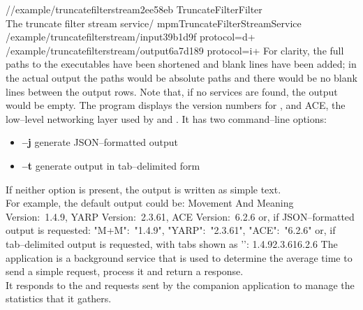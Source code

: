 /\serviceName/example/truncatefilterstream\textunderscore{}2ee58eb\pseudotab{}%
TruncateFilter\pseudotab{}Filter\pseudotab\\
The truncate filter stream service\pseudotwotabs\textellipsis/%
mpmTruncateFilterStreamService\pseudotab\\
/example/truncatefilterstream/input\textunderscore{}39b1d9f\textbraceleft{}%
protocol=d+\textbraceright\pseudotab\\
/example/truncatefilterstream/output\textunderscore{}6a7d189\textbraceleft{}%
protocol=i+\textbraceright
\outputEnd{}
For clarity, the full paths to the executables have been shortened and blank lines have
been added; in the actual output the paths would be absolute paths and there would be no
blank lines between the output rows.
Note that, if no services are found, the output would be empty.
The program  displays the version numbers for \mplusm{}, \yarp{}
and ACE, the low--level networking layer used by \mplusm{} and \yarp{}.
It has two command--line options:
\begin{itemize}
\item \textbf{--j} generate JSON--formatted output
\item \textbf{--t} generate output in tab--delimited form
\end{itemize}
If neither option is present, the output is written as simple text.\\

For example, the default output could be:
\outputBegin{}
Movement And Meaning Version:\ 1.4.9, YARP Version:\ 2.3.61, ACE Version:\ 6.2.6
\outputEnd{}
or, if JSON--formatted output is requested:
\outputBegin{}
\textbraceleft{} "M+M":\ "1.4.9", "YARP":\ "2.3.61", "ACE":\ "6.2.6" \textbraceright
\outputEnd{}
or, if tab--delimited output is requested, with tabs shown as
'\texttt{\boldmath{$\vdash$}}':
\outputBegin{}
1.4.9\pseudotab{}2.3.61\pseudotab{}6.2.6
\outputEnd{}
\secondaryEnd{}
\newpage
{}
The  application is a background service that is
used to determine the average time to send a simple request, process it and return a
response.\\

It responds to the  and
 requests sent by the
companion application  to manage the statistics
that it gathers.\\

